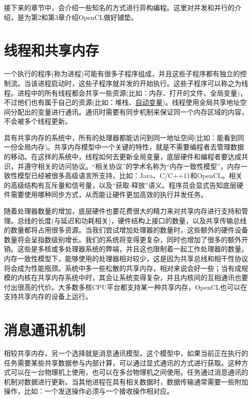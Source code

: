 接下来的章节中，会介绍一些知名的方式进行异构编程。这里对并发和并行的介绍，是为第2和第3章介绍OpenCL做好铺垫。



\section{线程和共享内存}

一个执行的程序(称为进程)可能有很多子程序组成，并且这些子程序都有独立的控制流。当该进程启动时，这些子程序就并发的开始执行。这些子程序可以称之为线程。进程中的所有线程都会共享一些资源(比如：内存、打开的文件、全局变量)，不过他们也有属于自己的资源(比如：堆栈、\href{https://zh.wikipedia.org/zh-cn/\%E8\%87\%AA\%E5\%8A\%A8\%E5\%8F\%98\%E9\%87\%8F}{自动变量})。线程使用全局共享地址空间分配出的变量进行通讯。通讯时需要有同步机制来保证同一个内存区域的内容，不会被多个线程更新。

具有共享内存的系统中，所有的处理器都能访问到同一地址空间(比如：能看到同一份全局内存)。共享内存模型中一个关键的特性，就是不需要编程者去管理数据的移动。在这样的系统中，线程如何去更新全局变量，底层硬件和编程者要达成共识，并遵守相关的访问协议。“相关协议”的学术名称为“内存一致性模型”，内存一致性模型已经被很多高级语言所支持，比如：Java、C/C++11和OpenCL。相关的高级结构有互斥量和信号量，以及“获取-释放”语义。程序员会显式告知底层硬件需要使用哪种同步方式，从而能让硬件更加高效的执行并发任务。

随着处理器数量的增加，底层硬件也要花费很大的精力来对共享内存进行支持和管理。总线的长度(与延迟和功耗相关)，硬件结构上接口的数量，以及共享传输总线的数量都将占用很多资源。当我们尝试增加处理器的数量时，这些额外的硬件设备数量将会呈指数级别增长。我们的系统将变得更复杂，同时也增加了很多的额外开销。这些是多核或多处理器系统的弊端，并且这也限制着一起工作处理器的数量。内存一致性模型下，能够使用的处理器相对较少，这是因为共享总线和相干性协议将会成为性能瓶颈。系统中多一些松散的共享内存，相对来说会好一些；当有成规模的内核在共享内存系统中时，其会让系统变得复杂，并且内核间的互相通讯也要付出很高的代价。大多数多核CPU平台都支持某一种共享内存，OpenCL也可以在支持共享内存的设备上运行。



\section{消息通讯机制}

相较共享内存，另一个选择就是消息通讯模型。这个模型中，如果当前正在执行的任务需要某些共享数据参与内部计算，可以通过显式通讯的方式进行获取。这种方式可以在一台物理机上使用，也可以在多台物理机之间使用。任务通过消息通讯的机制对数据进行更新。当其他进程在具有相关数据时，数据传输通常需要一些附加操作，比如：一个发送操作必须与一个接收操作相对应。

